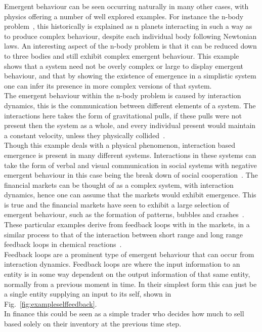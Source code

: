 \documentclass{article}
\begin{document}
Emergent behaviour can be seen occurring naturally in many other cases, with physics offering a number of well explored examples. For instance the n-body problem~\cite{nbodyproblem}, this historically is explained as n planets interacting in such a way as to produce complex behaviour, despite each individual body following Newtonian laws. An interesting aspect of the n-body problem is that it can be reduced down to three bodies and still exhibit complex emergent behaviour. This example shows that a system need not be overly complex or large to display emergent behaviour, and that by showing the existence of emergence in a simplistic system one can infer its presence in more complex versions of that system.\\
The emergent behaviour within the n-body problem is caused by interaction dynamics, this is the communication between different elements of a system. The interactions here takes the form of gravitational pulls, if these pulls were not present then the system as a whole, and every individual present would maintain a constant velocity, unless they physically collided~\cite{newtonconstantvelocity}.\\
Though this example deals with a physical phenomenon, interaction based emergence is present in many different systems. Interactions in these systems can take the form of verbal and visual communication in social systems with negative emergent behaviour in this case being the break down of social cooperation~\cite{socialemrgence}. The financial markets can be thought of as a complex system, with interaction dynamics, hence one can assume that the markets would exhibit emergence. This is true and the financial markets have seen to exhibit a large selection of emergent behaviour, such as the formation of patterns, bubbles and crashes~\cite{bubblesandcrashes}. These particular examples derive from feedback loops with in the markets, in a similar process to that of the interaction between short range and long range feedback loops in chemical reactions~\cite{turningchemical}.\\     
Feedback loops are a prominent type of emergent behaviour that can occur from interaction dynamics. Feedback loops are where the input information to an entity is in some way dependent on the output information of that same entity, normally from a previous moment in time. In their simplest form this can just be a single entity supplying an input to its self, shown in Fig.~\ref{fig:exampleselffeedback}.\\
In finance this could be seen as a simple trader who decides how much to sell based solely on their inventory at the previous time step. 
\end{document}
